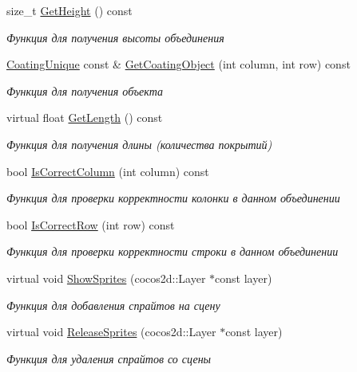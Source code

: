 \begin{DoxyCompactItemize}
size\+\_\+t \hyperlink{classrtm_1_1_coating_union_ac9530320f820757aec11c51bcf8eb3cc}{Get\+Height} () const
\begin{DoxyCompactList}\small\item\em Функция для получения высоты объединения \end{DoxyCompactList}\item 
\hyperlink{namespacertm_ab0ec616a26920aeaf720d04e041e8ce3}{Coating\+Unique} const  \& \hyperlink{classrtm_1_1_coating_union_acbcdbbd157f6d55597a54bb639a977f2}{Get\+Coating\+Object} (int column, int row) const
\begin{DoxyCompactList}\small\item\em Функция для получения объекта \end{DoxyCompactList}\item 
virtual float \hyperlink{classrtm_1_1_coating_union_adf3ec4f4e8399c455aaa73bfe726b4ce}{Get\+Length} () const
\begin{DoxyCompactList}\small\item\em Функция для получения длины (количества покрытий) \end{DoxyCompactList}\item 
bool \hyperlink{classrtm_1_1_coating_union_a7f77378af1ea7473d10497ad01effcad}{Is\+Correct\+Column} (int column) const
\begin{DoxyCompactList}\small\item\em Функция для проверки корректности колонки в данном объединении \end{DoxyCompactList}\item 
bool \hyperlink{classrtm_1_1_coating_union_abbd51ea78ee3d798807827f6ee930540}{Is\+Correct\+Row} (int row) const
\begin{DoxyCompactList}\small\item\em Функция для проверки корректности строки в данном объединении \end{DoxyCompactList}\item 
virtual void \hyperlink{classrtm_1_1_coating_union_ae95be187677aec759723edb4d14b35c1}{Show\+Sprites} (cocos2d\+::\+Layer $\ast$const layer)
\begin{DoxyCompactList}\small\item\em Функция для добавления спрайтов на сцену \end{DoxyCompactList}\item 
virtual void \hyperlink{classrtm_1_1_coating_union_a4e046aae25ce91da0408ac31a0de4e21}{Release\+Sprites} (cocos2d\+::\+Layer $\ast$const layer)
\begin{DoxyCompactList}\small\item\em Функция для удаления спрайтов со сцены \end{DoxyCompactList}\end{DoxyCompactItemize}
